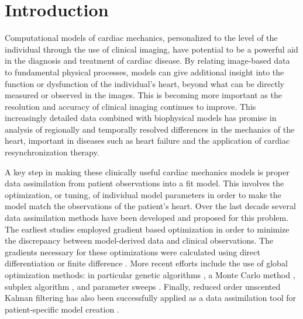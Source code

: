 
\newpage
\section{Introduction}
Computational models of cardiac mechanics, personalized to the level of the individual 
through the use of clinical imaging, have potential to be a powerful aid in the diagnosis and 
treatment of cardiac disease.  By relating image-based data to fundamental physical 
processes, models can give additional insight into the function or dysfunction of the 
individual's heart, beyond what can be directly measured or observed in the images. 
This is becoming more important as the resolution and accuracy of clinical imaging continues to 
improve.  This increasingly detailed data combined with biophysical models has promise 
in analysis of regionally and temporally resolved differences in the mechanics of the heart, 
important in diseases such as heart failure and the application of cardiac resynchronization therapy. 

A key step in making these clinically useful cardiac mechanics models is proper data assimilation from patient observations into a fit model. This involves the optimization, or tuning, of individual model parameters in order to make the model match the observations of the patient's heart.  Over the last decade several data assimilation methods have been developed and proposed for this problem. The earliest studies employed gradient based optimization in order to minimize the discrepancy between model-derived data and clinical observations.  The gradients necessary for these optimizations were calculated using direct differentiation \cite{sermesant2006cardiac}
or finite difference \cite{augenstein2005method, gao2015parameter, Wang2009}.
More recent efforts include the use of global optimization methods:
in particular genetic algorithms \cite{mojsejenko2014estimating,
sun2009computationally}, a Monte Carlo method \cite{neumann2014robust},
subplex algorithm \cite{wong2015velocity}, and parameter sweeps \cite{asner2015estimation, hadjicharalambous2015analysis}.
Finally, reduced order unscented Kalman filtering has also been successfully applied as
a data assimilation tool for patient-specific model creation \cite{chabiniok2012estimation,
xi2011myocardial, Marchesseau2013}.

